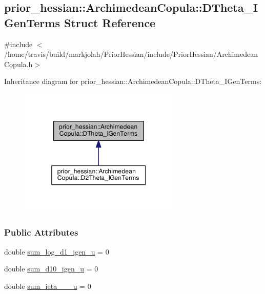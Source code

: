 \hypertarget{structprior__hessian_1_1ArchimedeanCopula_1_1DTheta__IGenTerms}{}\subsection{prior\+\_\+hessian\+:\+:Archimedean\+Copula\+:\+:D\+Theta\+\_\+\+I\+Gen\+Terms Struct Reference}
\label{structprior__hessian_1_1ArchimedeanCopula_1_1DTheta__IGenTerms}


{\ttfamily \#include $<$/home/travis/build/markjolah/\+Prior\+Hessian/include/\+Prior\+Hessian/\+Archimedean\+Copula.\+h$>$}



Inheritance diagram for prior\+\_\+hessian\+:\+:Archimedean\+Copula\+:\+:D\+Theta\+\_\+\+I\+Gen\+Terms\+:\nopagebreak
\begin{figure}[H]
\begin{center}
\leavevmode
\includegraphics[width=217pt]{structprior__hessian_1_1ArchimedeanCopula_1_1DTheta__IGenTerms__inherit__graph}
\end{center}
\end{figure}
\subsubsection*{Public Attributes}
\begin{DoxyCompactItemize}
\item 
double \hyperlink{structprior__hessian_1_1ArchimedeanCopula_1_1DTheta__IGenTerms_aa92089ec503423453715423320611ac6}{sum\+\_\+log\+\_\+d1\+\_\+igen\+\_\+u} = 0
\item 
double \hyperlink{structprior__hessian_1_1ArchimedeanCopula_1_1DTheta__IGenTerms_a5f3cdeb0ee5ce6746c9aa9361cfd63c5}{sum\+\_\+d10\+\_\+igen\+\_\+u} = 0
\item 
double \hyperlink{structprior__hessian_1_1ArchimedeanCopula_1_1DTheta__IGenTerms_a11654a086a49357a64d6b002a3f67f56}{sum\+\_\+ieta\+\_\+\_\+\_\+u} = 0
\end{DoxyCompactItemize}



